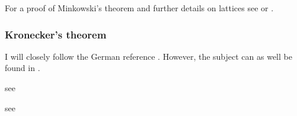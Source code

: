 For a proof of Minkowski's theorem and further details on lattices see \cite[4.4, p.~28]{Neukirch2006} or \cite[Thm.~4.19]{Milne2017}.

\subsubsection{Kronecker's theorem}

I will closely follow the German reference \cite[§2]{Hlawka1986}. However, the
subject can as well be found in \cite[see][§23]{Hardy1975}.


\begin{thm}\label{thm:Dirichlet}
    see \cite[Thm.~5.1]{Milne2017}
\end{thm}

\begin{thm}
    see \cite[§ 66]{Meara2000}
\end{thm}
